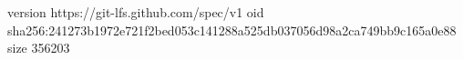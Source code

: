 version https://git-lfs.github.com/spec/v1
oid sha256:241273b1972e721f2bed053c141288a525db037056d98a2ca749bb9c165a0e88
size 356203
